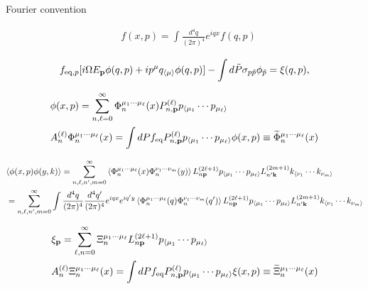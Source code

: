 \documentclass[aps,prd,preprint,nofootinbib,amsmath,amssymb,showpacs,longbibliography,singlecolumn,superscriptaddress,10pt]{revtex4-1}
\theoremstyle{plain}
\theoremstyle{definition}
\begin{document}
Fourier convention

\begin{equation}
\begin{aligned}
 &
 f(x,p) = \int \frac{d^{4}q}{(2 \pi)^{4}} e^{i q x}  f(q,p)
\end{aligned}    
\end{equation}


\begin{equation}
f_{\mathrm{eq},p} [i \Omega E_{\bf p}  \phi(q,p) + i p^{\mu} q_{\langle \mu \rangle} \phi(q,p)]  
   -
\int d \Tilde{P} \sigma_{p \Tilde{p}} \phi_{\Tilde{p}} =  \xi(q,p) ,
\end{equation}



\begin{equation}
\begin{aligned}
 &
 \phi(x,p) = \sum_{n,\ell = 0}^{\infty} \Phi_{n}^{\mu_{1} \cdots \mu_{\ell}}(x) P_{n,{\bf p}}^{(\ell)} p_{\langle \mu_{1}} \cdots p_{ \mu_{\ell} \rangle}
\\
&
A_{n}^{(\ell)}\Phi_{n}^{\mu_{1} \cdots \mu_{\ell}}(x)
=
\int dP f_{\mathrm{eq}}  P_{n,{\bf p}}^{(\ell)} p_{\langle \mu_{1}} \cdots p_{ \mu_{\ell} \rangle} \phi(x,p)
\equiv
\widetilde{\Phi}_{n}^{\mu_{1} \cdots \mu_{\ell}}(x)
\end{aligned}    
\end{equation}





\begin{equation}
\begin{aligned}
&\langle \phi(x,p) \phi(y,k)  \rangle 
=
\sum_{n,\ell, n',m = 0}^{\infty} \left\langle \Phi_{n}^{\mu_{1} \cdots \mu_{\ell}}(x) \Phi_{n}^{\nu_{1} \cdots \nu_{m}}(y) \right\rangle L^{(2 \ell + 1)}_{n {\bf p}} p_{\langle \mu_{1}} \cdots p_{ \mu_{\ell} \rangle}
L^{(2 m + 1)}_{n' {\bf k}} k_{\langle \nu_{1}} \cdots k_{ \nu_{m} \rangle} \\
&
=
\sum_{n,\ell, n',m = 0}^{\infty}
\int \frac{d^{4}q}{(2 \pi)^{4}}  \frac{d^{4}q'}{(2 \pi)^{4}} e^{iqx} e^{iq'y} \left\langle \Phi_{n}^{\mu_{1} \cdots \mu_{\ell}}(q) \Phi_{n}^{\nu_{1} \cdots \nu_{m}}(q') \right\rangle L^{(2 \ell + 1)}_{n {\bf p}} p_{\langle \mu_{1}} \cdots p_{ \mu_{\ell} \rangle}
L^{(2 m + 1)}_{n' {\bf k}} k_{\langle \nu_{1}} \cdots k_{ \nu_{m} \rangle}
\end{aligned}    
\end{equation}


\begin{equation}
\begin{aligned}
&
\xi_{\bf p} = \sum_{\ell, n = 0}^{\infty} \Xi_{n}^{\mu_{1} \cdots \mu_{\ell}} L^{(2 \ell + 1)}_{n {\bf p}} p_{\langle \mu_{1}} \cdots p_{\mu_{\ell} \rangle}
\\
&
A_{n}^{(\ell)}\Xi_{n}^{\mu_{1} \cdots \mu_{\ell}}(x)
=
\int dP f_{\mathrm{eq}}  P_{n,{\bf p}}^{(\ell)} p_{\langle \mu_{1}} \cdots p_{ \mu_{\ell} \rangle} \xi(x,p)
\equiv
\widetilde{\Xi}_{n}^{\mu_{1} \cdots \mu_{\ell}}(x)
\end{aligned}    
\end{equation}
\end{document}
